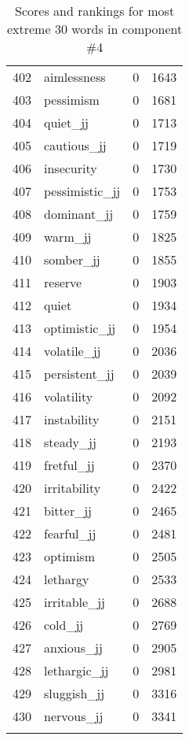 \begin{longtable}[!htbp]{| rlr@{.}l |}
    402 & aimlessness & 0 & 1643 \\
    403 & pessimism & 0 & 1681 \\
    404 & quiet\_jj & 0 & 1713 \\
    405 & cautious\_jj & 0 & 1719 \\
    406 & insecurity & 0 & 1730 \\
    407 & pessimistic\_jj & 0 & 1753 \\
    408 & dominant\_jj & 0 & 1759 \\
    409 & warm\_jj & 0 & 1825 \\
    410 & somber\_jj & 0 & 1855 \\
    411 & reserve & 0 & 1903 \\
    412 & quiet & 0 & 1934 \\
    413 & optimistic\_jj & 0 & 1954 \\
    414 & volatile\_jj & 0 & 2036 \\
    415 & persistent\_jj & 0 & 2039 \\
    416 & volatility & 0 & 2092 \\
    417 & instability & 0 & 2151 \\
    418 & steady\_jj & 0 & 2193 \\
    419 & fretful\_jj & 0 & 2370 \\
    420 & irritability & 0 & 2422 \\
    421 & bitter\_jj & 0 & 2465 \\
    422 & fearful\_jj & 0 & 2481 \\
    423 & optimism & 0 & 2505 \\
    424 & lethargy & 0 & 2533 \\
    425 & irritable\_jj & 0 & 2688 \\
    426 & cold\_jj & 0 & 2769 \\
    427 & anxious\_jj & 0 & 2905 \\
    428 & lethargic\_jj & 0 & 2981 \\
    429 & sluggish\_jj & 0 & 3316 \\
    430 & nervous\_jj & 0 & 3341 \\
    \hline
    \caption{Scores and rankings for most extreme 30 words in component \#4} \\
\end{longtable}
